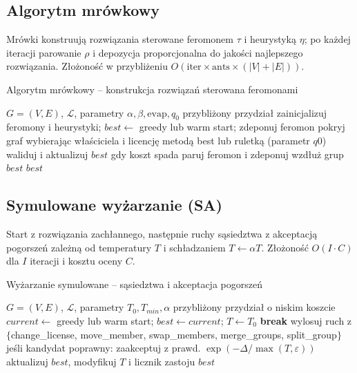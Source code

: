 \subsection{Algorytm mrówkowy}
Mrówki konstruują rozwiązania sterowane feromonem $\tau$ i heurystyką $\eta$; po każdej iteracji parowanie $\rho$ i depozycja proporcjonalna do jakości najlepszego rozwiązania. Złożoność w przybliżeniu $O(\text{iter}\times\text{ants}\times(|V|+|E|))$.

\begin{algorithm}[H]
\caption{Algorytm mrówkowy – konstrukcja rozwiązań sterowana feromonami}
\label{alg:aco}
\begin{algorithmic}[1]
\Require $G=(V,E)$, $\mathcal{L}$, parametry $\alpha,\beta,\text{evap},q_0$
\Ensure przybliżony przydział
\State zainicjalizuj feromony i heurystyki; $best\gets$ greedy lub warm start; zdeponuj feromon
    \State pokryj graf wybierając właściciela i licencję metodą best lub ruletką (parametr $q0$)
    \State waliduj i aktualizuj $best$ gdy koszt spada
  \EndFor
  \State paruj feromon i zdeponuj wzdłuż grup $best$
\EndFor
\State \Return $best$
\end{algorithmic}
\end{algorithm}

\subsection{Symulowane wyżarzanie (SA)}
Start z rozwiązania zachłannego, następnie ruchy sąsiedztwa z akceptacją pogorszeń zależną od temperatury $T$ i schładzaniem $T\leftarrow \alpha T$. Złożoność $O(I\cdot C)$ dla $I$ iteracji i kosztu oceny $C$.

\begin{algorithm}[H]
\caption{Wyżarzanie symulowane – sąsiedztwa i akceptacja pogorszeń}
\label{alg:sa}
\begin{algorithmic}[1]
\Require $G=(V,E)$, $\mathcal{L}$, parametry $T_0, T_{min}, \alpha$
\Ensure przybliżony przydział o niskim koszcie
\State $current\gets$ greedy lub warm start; $best\gets current$; $T\gets T_0$
   \textbf{break} \EndIf
  \State wylosuj ruch z $\{$change\_license, move\_member, swap\_members, merge\_groups, split\_group$\}$
  \State jeśli kandydat poprawny: zaakceptuj z prawd. $\exp(-\Delta/\max(T,\varepsilon))$
  \State aktualizuj $best$, modyfikuj $T$ i licznik zastoju
\EndFor
\State \Return $best$
\end{algorithmic}
\end{algorithm}
